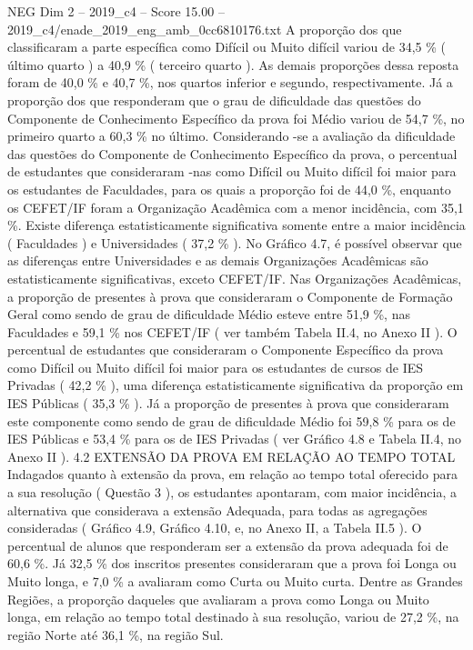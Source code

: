 \begin{textsample}{NEG Dim 2 – 2019\_c4 – Score 15.00 – 2019\_c4/enade\_2019\_eng\_amb\_0cc6810176.txt}
A proporção dos que classificaram a parte específica como Difícil ou Muito difícil variou de 34,5 \% ( último quarto ) a 40,9 \% ( terceiro quarto ).
As demais proporções dessa reposta foram de 40,0 \% e 40,7 \%, nos quartos inferior e segundo, respectivamente.
Já a proporção dos que responderam que o grau de dificuldade das questões do Componente de Conhecimento Específico da prova foi Médio variou de 54,7 \%, no primeiro quarto a 60,3 \% no último.
Considerando -se a avaliação da dificuldade das questões do Componente de Conhecimento Específico da prova, o percentual de estudantes que consideraram -nas como Difícil ou Muito difícil foi maior para os estudantes de Faculdades, para os quais a proporção foi de 44,0 \%, enquanto os CEFET/IF foram a Organização Acadêmica com a menor incidência, com 35,1 \%.
Existe diferença estatisticamente significativa somente entre a maior incidência ( Faculdades ) e Universidades ( 37,2 \% ).
No Gráfico 4.7, é possível observar que as diferenças entre Universidades e as demais Organizações Acadêmicas são estatisticamente significativas, exceto CEFET/IF.
Nas Organizações Acadêmicas, a proporção de presentes à prova que consideraram o Componente de Formação Geral como sendo de grau de dificuldade Médio esteve entre 51,9 \%, nas Faculdades e 59,1 \% nos CEFET/IF ( ver também Tabela II.4, no Anexo II ).
O percentual de estudantes que consideraram o Componente Específico da prova como Difícil ou Muito difícil foi maior para os estudantes de cursos de IES Privadas ( 42,2 \% ), uma diferença estatisticamente significativa da proporção em IES Públicas ( 35,3 \% ).
Já a proporção de presentes à prova que consideraram este componente como sendo de grau de dificuldade Médio foi 59,8 \% para os de IES Públicas e 53,4 \% para os de IES Privadas ( ver Gráfico 4.8 e Tabela II.4, no Anexo II ). 4.2 EXTENSÃO DA PROVA EM RELAÇÃO AO TEMPO TOTAL Indagados quanto à extensão da prova, em relação ao tempo total oferecido para a sua resolução ( Questão 3 ), os estudantes apontaram, com maior incidência, a alternativa que considerava a extensão Adequada, para todas as agregações consideradas ( Gráfico 4.9, Gráfico 4.10, e, no Anexo II, a Tabela II.5 ).
O percentual de alunos que responderam ser a extensão da prova adequada foi de 60,6 \%.
Já 32,5 \% dos inscritos presentes consideraram que a prova foi Longa ou Muito longa, e 7,0 \% a avaliaram como Curta ou Muito curta.
Dentre as Grandes Regiões, a proporção daqueles que avaliaram a prova como Longa ou Muito longa, em relação ao tempo total destinado à sua resolução, variou de 27,2 \%, na região Norte até 36,1 \%, na região Sul.

\end{textsample}
